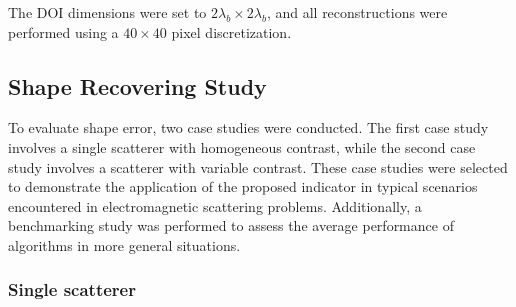\documentclass{IEEEtran}
\begin{document}
        The DOI dimensions were set to $2\lambda_b \times 2\lambda_b$, and all reconstructions were performed using a $40 \times 40$ pixel discretization.

		\subsection{Shape Recovering Study}\label{sec:results:shape}
		

            To evaluate shape error, two case studies were conducted. The first case study involves a single scatterer with homogeneous contrast, while the second case study involves a scatterer with variable contrast. These case studies were selected to demonstrate the application of the proposed indicator in typical scenarios encountered in electromagnetic scattering problems. Additionally, a benchmarking study was performed to assess the average performance of algorithms in more general situations.
			

			\subsubsection{Single scatterer}\label{sec:results:shape:star}

\end{document}
